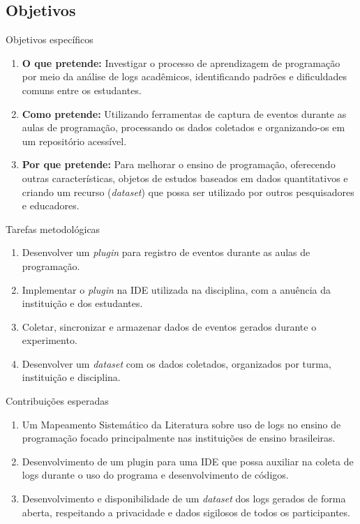 \documentclass{if-beamer}
\begin{document}
\subsection{Objetivos}
\begin{frame}{Objetivos específicos}

    \begin{enumerate}
	\item \textbf{O que pretende:} Investigar o processo de aprendizagem de programação por meio da análise de logs acadêmicos, identificando padrões e dificuldades comuns entre os estudantes.
	\item \textbf{Como pretende:} Utilizando ferramentas de captura de eventos durante as aulas de programação, processando os dados coletados e organizando-os em um repositório acessível.
	\item \textbf{Por que pretende:} Para melhorar o ensino de programação, oferecendo outras características, objetos de estudos baseados em dados quantitativos e criando um recurso (\textit{dataset}) que possa ser utilizado por outros pesquisadores e educadores.
\end{enumerate}
\end{frame}

\begin{frame}{Tarefas metodológicas}
\begin{enumerate}
	\item Desenvolver um \textit{plugin} para registro de eventos durante as aulas de programação.
	\item Implementar o \textit{plugin} na IDE utilizada na disciplina, com a anuência da instituição e dos estudantes.
	\item Coletar, sincronizar e armazenar dados de eventos gerados durante o experimento.
	\item Desenvolver um \textit{dataset} com os dados coletados, organizados por turma, instituição e disciplina.
\end{enumerate}

\end{frame}
\begin{frame}{Contribuições esperadas}
\begin{enumerate}
    \item Um Mapeamento Sistemático da Literatura sobre uso de logs no ensino de programação focado 
    principalmente nas instituições de ensino brasileiras. 
     \item Desenvolvimento de um plugin para uma IDE que possa auxiliar na coleta de logs durante o uso do 
     programa e desenvolvimento de códigos.
     \item Desenvolvimento e disponibilidade de um \textit{dataset} dos logs gerados de forma aberta, respeitando a 
     privacidade e dados sigilosos de todos os participantes. 
\end{enumerate}

\end{frame}
\end{document}
